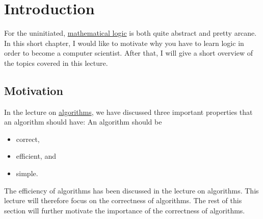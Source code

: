 \chapter{Introduction}
For the uninitiated, \href{https://en.wikipedia.org/wiki/Mathematical_logic}{mathematical logic} 
is both quite abstract and pretty arcane.  
In this short chapter, I would like to motivate why you have to learn
logic in order to become a computer scientist.  After that, I will give a short overview of the topics covered
in this lecture.

\section{Motivation}
In the lecture on \href{https://github.com/karlstroetmann/Algorithms/blob/master/Lecture-Notes/algorithms.pdf}{algorithms},
we have discussed three important properties that an algorithm should have:
An algorithm should be
\begin{itemize}
\item correct,
\item efficient, and
\item simple.  
\end{itemize}
The efficiency of algorithms has been discussed in the lecture on algorithms.  This lecture will
therefore focus on the correctness of algorithms.  The rest of this section will further motivate the
importance of the correctness of algorithms. 

